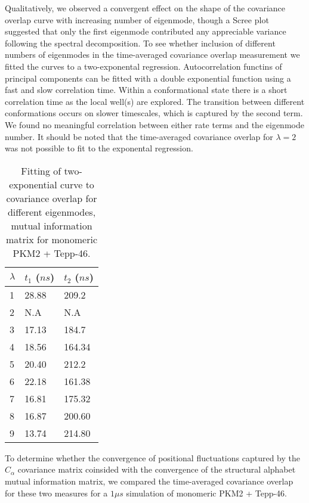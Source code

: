 \documentclass[11pt]{article}
\begin{document}
Qualitatively, we observed a convergent effect on the shape of the covariance overlap curve with increasing number of eigenmode, though a Scree plot suggested that only the first eigenmode contributed any appreciable variance following the spectral decomposition. To see whether inclusion of different numbers of eigenmodes in the time-averaged covariance overlap measurement we fitted the curves to a two-exponental regression. Autocorrelation functins of principal components can be fitted with a double exponential function using a fast and slow correlation time. Within a conformational state there is a short correlation time as the local well(s) are explored. The transition between different conformations occurs on slower timescales, which is captured by the second term. We found no meaningful correlation between either rate terms and the eigenmode number. It should be noted that the time-averaged covariance overlap for $\lambda=2$ was not possible to fit to the exponental regression.
\begin{table}[!ht]
\centering
\caption{Fitting of two-exponential curve to covariance overlap for different eigenmodes, mutual information matrix for monomeric PKM2 + Tepp-46.}
\label{Table 1}
\begin{tabular}{@{}lll@{}}
\toprule
$\lambda$ & $t_1$ ($ns$) & $t_2$ ($ns$) \\ \midrule
1         & 28.88         & 209.2        \\
2         & N.A           & N.A          \\
3         & 17.13         & 184.7        \\
4         & 18.56         & 164.34       \\
5         & 20.40         & 212.2        \\
6         & 22.18         & 161.38       \\
7         & 16.81         & 175.32       \\
8         & 16.87         & 200.60       \\
9         & 13.74         & 214.80       \\ \bottomrule
\end{tabular}
\end{table} 
To determine whether the convergence of positional fluctuations captured by the $C_\alpha$ covariance matrix coinsided with the convergence of the structural alphabet mutual information matrix, we compared the time-averaged covariance overlap for these two measures for a $1 \mu s$ simulation of monomeric PKM2 + Tepp-46.
\end{document}

